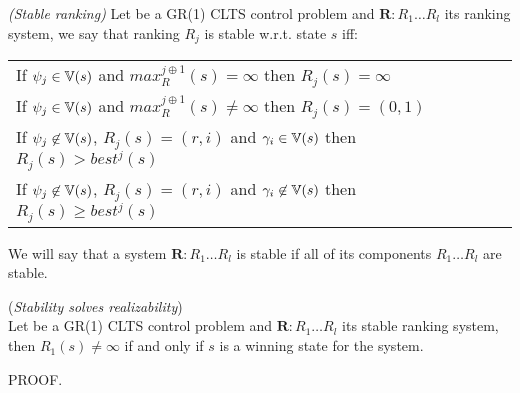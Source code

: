 \begin{definition}\label{def:gr1_stable_ranking} \emph{(Stable ranking)} 
	Let \controlProblemDef be a GR(1) CLTS control problem and $\mathbf{R}:R_1 \ldots R_l$ its ranking system, we say that ranking $R_j$ is stable w.r.t. state $s$ iff:
	\vspace{1em}
	\begin{center}
		\begin{tabular}{l}
			If $\psi_j \in \mathbb{V}(s)$ and $max_R^{j \oplus 1}(s) = \infty$ then $R_j(s) = \infty$\\
			If $\psi_j \in \mathbb{V}(s)$ and $max_R^{j \oplus 1}(s) \neq \infty$ then $R_j(s) = (0,1)$\\			
			If $\psi_j \not\in \mathbb{V}(s)$, $R_j(s) = (r,i)$ and $\gamma_i \in \mathbb{V}(s)$ then  $R_j(s) > best^j(s)$\\						
			If $\psi_j \not\in \mathbb{V}(s)$, $R_j(s) = (r,i)$ and $\gamma_i \not\in \mathbb{V}(s)$ then  $R_j(s) \geq best^j(s)$\\
		\end{tabular}
	\end{center}
We will say that a system $\mathbf{R}:R_1 \ldots R_l$ is stable if all of its components $R_1 \ldots R_l$ are stable.
\end{definition}

\begin{theorem}(\emph{Stability solves realizability})\label{theorem:gr1_stability_realizability}\\
	Let \controlProblemDef be a GR(1) CLTS control problem and $\mathbf{R}:R_1 \ldots R_l$ its stable ranking system, then $R_1(s) \neq \infty$ if and only if $s$ is a winning state for the system.
	\normalsize
\end{theorem}

PROOF.